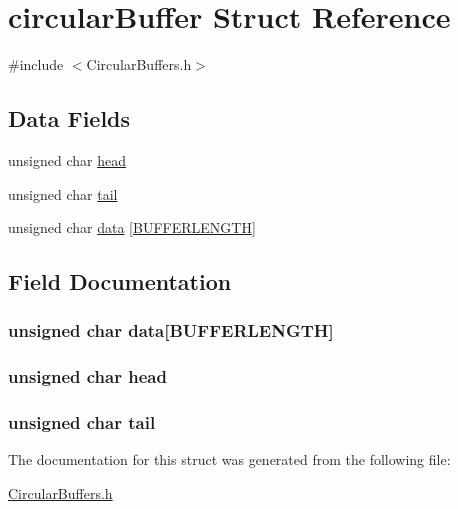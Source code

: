 \hypertarget{structcircular_buffer}{\section{circular\+Buffer Struct Reference}
\label{structcircular_buffer}
}


{\ttfamily \#include $<$Circular\+Buffers.\+h$>$}

\subsection*{Data Fields}
\begin{DoxyCompactItemize}
\item 
unsigned char \hyperlink{structcircular_buffer_a47f7e6109597e5c1c227993c0ce5f560}{head}
\item 
unsigned char \hyperlink{structcircular_buffer_af18a1d7542e277284c4794593b049258}{tail}
\item 
unsigned char \hyperlink{structcircular_buffer_ad7b57ba90694482456be1fbab7de4aec}{data} \mbox{[}\hyperlink{_circular_buffers_8h_a5a69f707d5405fe875b322c6bfbace46}{B\+U\+F\+F\+E\+R\+L\+E\+N\+G\+T\+H}\mbox{]}
\end{DoxyCompactItemize}


\subsection{Field Documentation}
\hypertarget{structcircular_buffer_ad7b57ba90694482456be1fbab7de4aec}{
\subsubsection[{data}]{\setlength{\rightskip}{0pt plus 5cm}unsigned char data\mbox{[}{\bf B\+U\+F\+F\+E\+R\+L\+E\+N\+G\+T\+H}\mbox{]}}}\label{structcircular_buffer_ad7b57ba90694482456be1fbab7de4aec}
\hypertarget{structcircular_buffer_a47f7e6109597e5c1c227993c0ce5f560}{
\subsubsection[{head}]{\setlength{\rightskip}{0pt plus 5cm}unsigned char head}}\label{structcircular_buffer_a47f7e6109597e5c1c227993c0ce5f560}
\hypertarget{structcircular_buffer_af18a1d7542e277284c4794593b049258}{
\subsubsection[{tail}]{\setlength{\rightskip}{0pt plus 5cm}unsigned char tail}}\label{structcircular_buffer_af18a1d7542e277284c4794593b049258}


The documentation for this struct was generated from the following file\+:\begin{DoxyCompactItemize}
\item 
\hyperlink{_circular_buffers_8h}{Circular\+Buffers.\+h}\end{DoxyCompactItemize}
